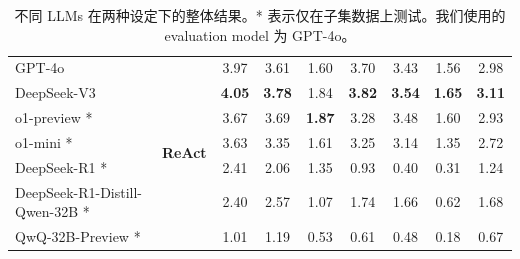 \documentclass[11pt]{article}
\begin{document}
\begin{table}[t]
{{\begin{tabular}{l | c | c c c | c  c  c | c }
        GPT-4o
        & \multirow{7}{*}{\textbf{ReAct}}
		& 3.97 
		& 3.61 
        & 1.60
        & 3.70
        & 3.43
        & 1.56
        & 2.98
        
		\\
  
		DeepSeek-V3
        &
		& \textbf{4.05} 
        & \textbf{3.78}
        & 1.84
        & \textbf{3.82}
        & \textbf{3.54}
        & \textbf{1.65} 
        & \textbf{3.11}

        \\

        o1-preview *
        &
		& 3.67 
		& 3.69 
        & \textbf{1.87}
        & 3.28
        & 3.48
        & 1.60
        & 2.93
        
		\\
  
		o1-mini *
        &
		& 3.63 
        & 3.35 
        & 1.61
        & 3.25
        & 3.14
        & 1.35 
        & 2.72

        \\

        
        DeepSeek-R1 *
        &
		& 2.41 
        & 2.06 
        & 1.35
        & 0.93
        & 0.40
        & 0.31
        & 1.24

        \\


        DeepSeek-R1-Distill-Qwen-32B *
        &
		& 2.40 
		& 2.57 
        & 1.07 
        & 1.74 
        & 1.66 
        & 0.62
        & 1.68
        
        \\
        
        
        QwQ-32B-Preview *
        &
		& 1.01 
		& 1.19 
        & 0.53
        & 0.61
        & 0.48
        & 0.18
        & 0.67
        
		\\
        \hline



	\end{tabular}
}
}
	\caption{不同 LLMs 在两种设定下的整体结果。* 表示仅在子集数据上测试。我们使用的 evaluation model 为 GPT-4o。
	}
	\label{table:overall_result}
\end{table}
\end{document}
